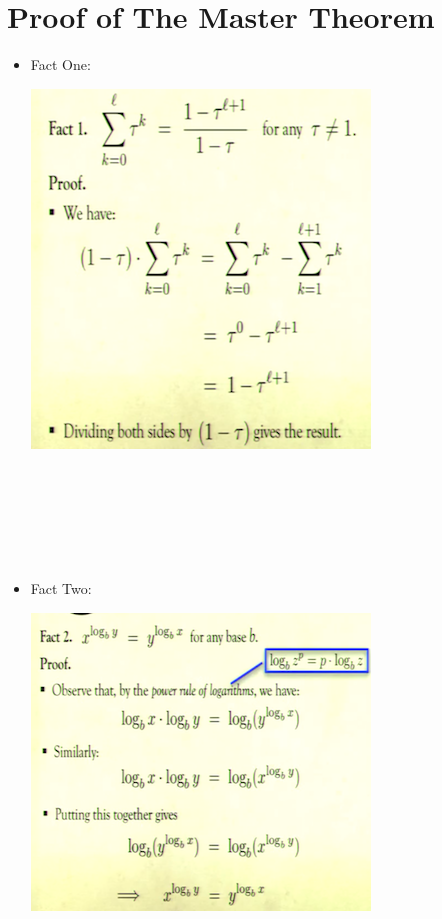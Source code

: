 \documentclass[12pt]{article}
\begin{document}
\section{Proof of The Master Theorem}
\renewcommand{\labelitemii}{$\circ$}
\renewcommand{\labelitemiii}{$\cdot$}
\renewcommand{\labelitemiii}{$\rightarrow$}
\begin{itemize}
\item Fact One:
\begin{center}
\includegraphics{lecture3c}
\end{center}
\noindent \\
\noindent \\
\noindent \\
\noindent \\
\noindent \\
\item Fact Two:
\begin{center}
\includegraphics{lecture3d}
\end{center}


\end{itemize}
\end{document}
